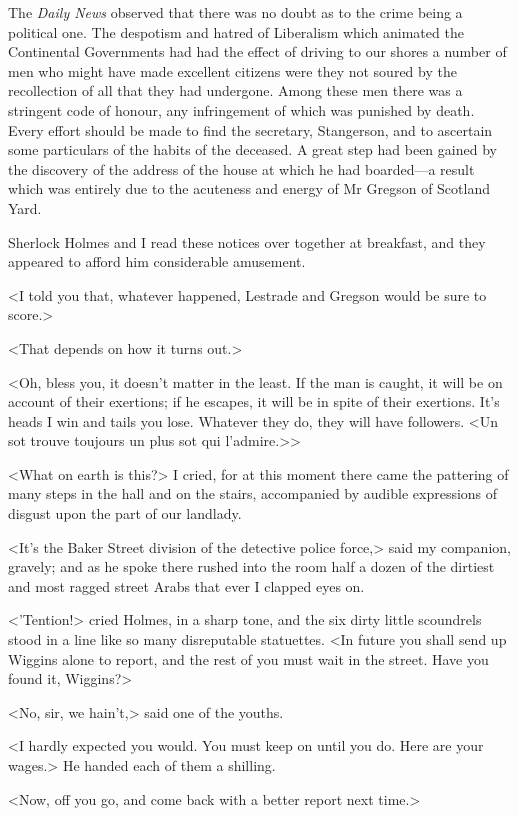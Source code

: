 The \textit{Daily News} observed that there was no doubt as to the crime being a political one. The despotism and hatred of Liberalism which animated the Continental Governments had had the effect of driving to our shores a number of men who might have made excellent citizens were they not soured by the recollection of all that they had undergone. Among these men there was a stringent code of honour, any infringement of which was punished by death. Every effort should be made to find the secretary, Stangerson, and to ascertain some particulars of the habits of the deceased. A great step had been gained by the discovery of the address of the house at which he had boarded—a result which was entirely due to the acuteness and energy of Mr Gregson of Scotland Yard.

Sherlock Holmes and I read these notices over together at breakfast, and they appeared to afford him considerable amusement.

<I told you that, whatever happened, Lestrade and Gregson would be sure to score.>

<That depends on how it turns out.>

<Oh, bless you, it doesn't matter in the least. If the man is caught, it will be on account of their exertions; if he escapes, it will be in spite of their exertions. It's heads I win and tails you lose. Whatever they do, they will have followers. <\textfrench{Un sot trouve toujours un plus sot qui l'admire.}>>

<What on earth is this?> I cried, for at this moment there came the pattering of many steps in the hall and on the stairs, accompanied by audible expressions of disgust upon the part of our landlady.

<It's the Baker Street division of the detective police force,> said my companion, gravely; and as he spoke there rushed into the room half a dozen of the dirtiest and most ragged street Arabs that ever I clapped eyes on.

<'Tention!> cried Holmes, in a sharp tone, and the six dirty little scoundrels stood in a line like so many disreputable statuettes. <In future you shall send up Wiggins alone to report, and the rest of you must wait in the street. Have you found it, Wiggins?>

<No, sir, we hain't,> said one of the youths.

<I hardly expected you would. You must keep on until you do. Here are your wages.> He handed each of them a shilling.

<Now, off you go, and come back with a better report next time.>

